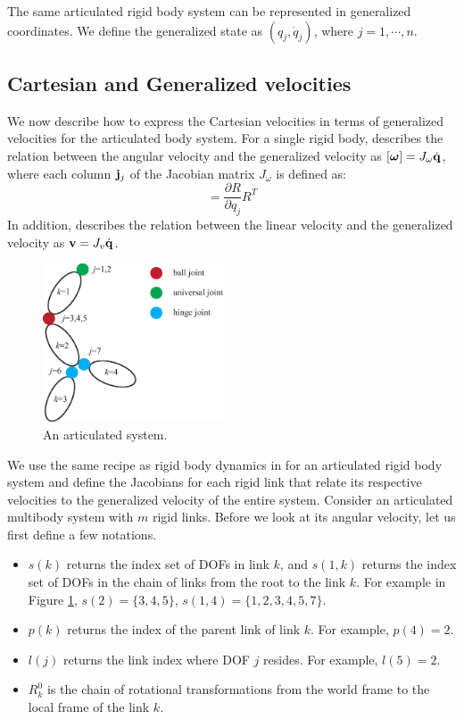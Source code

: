 The same articulated rigid body system can be represented in
generalized coordinates. We define the generalized state as $(q_j,
\dot{q}_j)$, where $j = 1, \cdots, n$.

\subsection{Cartesian and Generalized velocities}
We now describe how to express the Cartesian velocities in terms of generalized velocities for the articulated body system. 
For a single rigid body,  describes the relation between the angular velocity and the generalized velocity as $[\bm{\omega}] = J_{\omega} \dot{\mathbf{q}}$,
where each column $\mathbf{j}_j$ of the Jacobian matrix $J_{\omega}$ is defined as:
\begin{equation}
[\vc{j}_j] = \frac{\partial R}{\partial q_j} R^T
\end{equation}
In addition,  describes the relation between the linear velocity and the generalized velocity as $\mathbf{v} = J_v \dot{\mathbf{q}}$. 

\begin{figure}
 \vspace{-10pt}
\begin{center}
\includegraphics[width=2.1in]{example1.eps}
\end{center}
\caption{An articulated system.}
 \vspace{-20pt}
\label{fig:example1}
\end{figure}

We use the same recipe as rigid body dynamics in  for an articulated rigid body system and define the Jacobians for each rigid link that relate its respective velocities to the generalized velocity of the entire system. Consider an articulated multibody system with $m$ rigid links. Before we look
at its angular velocity, let us first define a few notations.
\begin{itemize}
\item $s(k)$ returns the index set of DOFs in link $k$, and $s(1, k)$
  returns the index set of DOFs in the chain of links from the root to
  the link $k$. For example in Figure \ref{fig:example1}, $s(2) = \{3, 4, 5\}$, $s(1, 4) = \{1, 2, 3,
    4, 5, 7\}$.
\item $p(k)$ returns the index of the parent link of link $k$. For
  example, $p(4) = 2$.
\item $l(j)$ returns the link index where DOF $j$ resides. For
  example, $l(5) = 2$.
\item $R^0_k$ is the chain of rotational transformations from the
  world frame to the local frame of the link $k$.
\end{itemize}

